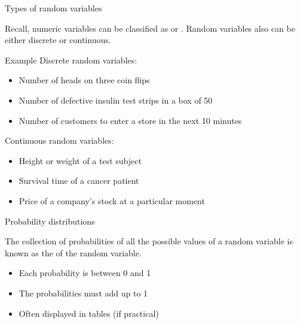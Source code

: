\documentclass[xcolor=table]{beamer}
\begin{document}
\begin{frame}{Types of random variables}
\begin{block}{}
Recall, numeric variables can be classified as  or . Random variables also can be either discrete or continuous.
\end{block}

\pause
\begin{exampleblock}{Example}
Discrete random variables:
\begin{itemize}
\item Number of heads on three coin flips
\item Number of defective insulin test strips in a box of 50
\item Number of customers to enter a store in the next 10 minutes
\end{itemize}
\pause
Continuous random variables:
\begin{itemize}
\item Height or weight of a test subject
\item Survival time of a cancer patient
\item Price of a company's stock at a particular moment
\end{itemize}
\end{exampleblock}
\end{frame}

\begin{frame}{Probability distributions}
\begin{block}{}
{\large The collection of probabilities of all the possible values of a random variable is known as the  of the random variable.}
\begin{itemize}
\pause\item Each probability is between 0 and 1
\pause\item The probabilities must add up to 1
\pause\item Often displayed in tables (if practical)
\end{itemize}
\end{block}
\end{frame}
\end{document}
